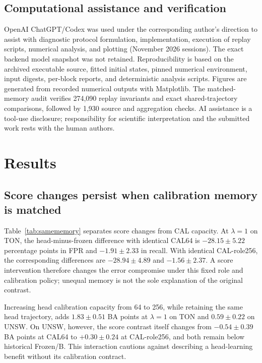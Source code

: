 \subsection{Computational assistance and verification}
OpenAI ChatGPT/Codex was used under the corresponding author's direction to assist with diagnostic protocol formulation, implementation, execution of replay scripts, numerical analysis, and plotting (November 2026 sessions). The exact backend model snapshot was not retained. Reproducibility is based on the archived executable source, fitted initial states, pinned numerical environment, input digests, per-block reports, and deterministic analysis scripts. Figures are generated from recorded numerical outputs with Matplotlib. The matched-memory audit verifies 274,090 replay invariants and exact shared-trajectory comparisons, followed by 1,930 source and aggregation checks. AI assistance is a tool-use disclosure; responsibility for scientific interpretation and the submitted work rests with the human authors.

\section{Results}
\subsection{Score changes persist when calibration memory is matched}
Table~\ref{tab:samememory} separates score changes from CAL capacity. At $\lambda=1$ on TON, the head-minus-frozen difference with identical CAL64 is $-28.15\pm5.22$ percentage points in FPR and $-1.91\pm2.33$ in recall. With identical CAL-role256, the corresponding differences are $-28.94\pm4.89$ and $-1.56\pm2.37$. A score intervention therefore changes the error compromise under this fixed role and calibration policy; unequal memory is not the sole explanation of the original contrast.

Increasing head calibration capacity from 64 to 256, while retaining the same head trajectory, adds $1.83\pm0.51$ BA points at $\lambda=1$ on TON and $0.59\pm0.22$ on UNSW. On UNSW, however, the score contrast itself changes from $-0.54\pm0.39$ BA points at CAL64 to $+0.30\pm0.24$ at CAL-role256, and both remain below historical Frozen/B. This interaction cautions against describing a head-learning benefit without its calibration contract.

